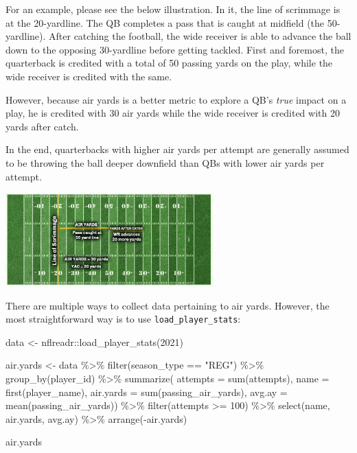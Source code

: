 \documentclass[
  letterpaper,
]{krantz}
\newenvironment{Shaded}{\begin{snugshade}}{\end{snugshade}}
\newcommand{\AttributeTok}[1]{\textcolor[rgb]{0.40,0.45,0.13}{#1}}
\newcommand{\DecValTok}[1]{\textcolor[rgb]{0.68,0.00,0.00}{#1}}
\newcommand{\FunctionTok}[1]{\textcolor[rgb]{0.28,0.35,0.67}{#1}}
\newcommand{\NormalTok}[1]{\textcolor[rgb]{0.00,0.23,0.31}{#1}}
\newcommand{\OtherTok}[1]{\textcolor[rgb]{0.00,0.23,0.31}{#1}}
\newcommand{\SpecialCharTok}[1]{\textcolor[rgb]{0.37,0.37,0.37}{#1}}
\newcommand{\StringTok}[1]{\textcolor[rgb]{0.13,0.47,0.30}{#1}}
\begin{document}
For an example, please see the below illustration. In it, the line of
scrimmage is at the 20-yardline. The QB completes a pass that is caught
at midfield (the 50-yardline). After catching the football, the wide
receiver is able to advance the ball down to the opposing 30-yardline
before getting tackled. First and foremost, the quarterback is credited
with a total of 50 passing yards on the play, while the wide receiver is
credited with the same.

However, because air yards is a better metric to explore a QB's
\emph{true} impact on a play, he is credited with 30 air yards while the
wide receiver is credited with 20 yards after catch.

In the end, quarterbacks with higher air yards per attempt are generally
assumed to be throwing the ball deeper downfield than QBs with lower air
yards per attempt.

\includegraphics[width=3.15in,height=\textheight]{images/airyards_101.png}

There are multiple ways to collect data pertaining to air yards.
However, the most straightforward way is to use
\texttt{load\_player\_stats}:

\begin{Shaded}
\begin{Highlighting}[]
\NormalTok{data }\OtherTok{\textless{}{-}}\NormalTok{ nflreadr}\SpecialCharTok{::}\FunctionTok{load\_player\_stats}\NormalTok{(}\DecValTok{2021}\NormalTok{)}

\NormalTok{air.yards }\OtherTok{\textless{}{-}}\NormalTok{ data }\SpecialCharTok{\%\textgreater{}\%}
  \FunctionTok{filter}\NormalTok{(season\_type }\SpecialCharTok{==} \StringTok{"REG"}\NormalTok{) }\SpecialCharTok{\%\textgreater{}\%}
  \FunctionTok{group\_by}\NormalTok{(player\_id) }\SpecialCharTok{\%\textgreater{}\%}
  \FunctionTok{summarize}\NormalTok{(}
    \AttributeTok{attempts =} \FunctionTok{sum}\NormalTok{(attempts),}
    \AttributeTok{name =} \FunctionTok{first}\NormalTok{(player\_name),}
    \AttributeTok{air.yards =} \FunctionTok{sum}\NormalTok{(passing\_air\_yards),}
    \AttributeTok{avg.ay =} \FunctionTok{mean}\NormalTok{(passing\_air\_yards)) }\SpecialCharTok{\%\textgreater{}\%}
  \FunctionTok{filter}\NormalTok{(attempts }\SpecialCharTok{\textgreater{}=} \DecValTok{100}\NormalTok{) }\SpecialCharTok{\%\textgreater{}\%}
  \FunctionTok{select}\NormalTok{(name, air.yards, avg.ay) }\SpecialCharTok{\%\textgreater{}\%}
  \FunctionTok{arrange}\NormalTok{(}\SpecialCharTok{{-}}\NormalTok{air.yards)}

\NormalTok{air.yards}
\end{Highlighting}
\end{Shaded}
\end{document}
